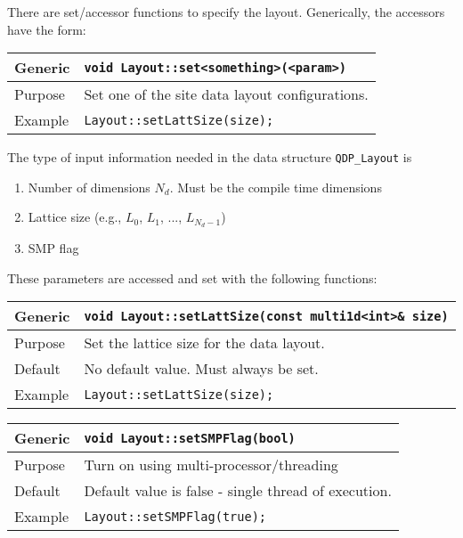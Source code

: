 \documentclass[12pt,letterpaper]{article}
\begin{document}
There are set/accessor functions to specify the layout.
Generically, the accessors have the form:

\begin{flushleft}
  \begin{tabular}{|l|l|}
  \hline
  Generic      & \verb|void Layout::set<something>(<param>)|\\
  \hline
  Purpose      & Set one of the site data layout configurations. \\
\hline
  Example  & \verb|Layout::setLattSize(size);| \\
   \hline
 \end{tabular}
\end{flushleft}

The type of input information needed in the data structure \verb|QDP_Layout| is
\begin{enumerate}
\item	Number of dimensions $N_d$. Must be the compile time dimensions
\item	Lattice size  (e.g., $L_0$, $L_1$, ..., $L_{N_d-1}$)
\item	SMP flag
\end{enumerate}

These parameters are accessed and set with the following functions:
\begin{flushleft}
  \begin{tabular}{|l|l|}
  \hline
  Generic      & \verb|void Layout::setLattSize(const multi1d<int>& size)|\\
  \hline
  Purpose      & Set the lattice size for the data layout. \\
  \hline
  Default      & No default value. Must always be set. \\
\hline
  Example  & \verb|Layout::setLattSize(size);| \\
   \hline
 \end{tabular}
\end{flushleft}

\begin{flushleft}
  \begin{tabular}{|l|l|}
  \hline
  Generic      & \verb|void Layout::setSMPFlag(bool)|\\
  \hline
  Purpose      & Turn on using multi-processor/threading \\
  \hline
  Default      & Default value is false - single thread of execution. \\
  \hline
  Example  & \verb|Layout::setSMPFlag(true);| \\
   \hline
 \end{tabular}
\end{flushleft}
\end{document}

